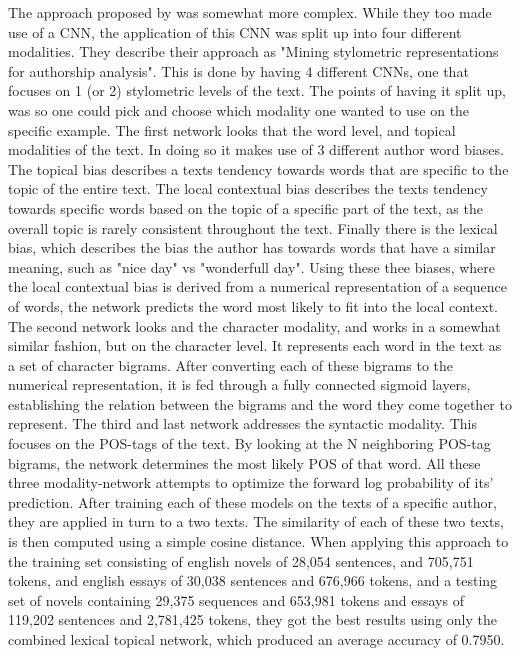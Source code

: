The approach proposed by \cite{ding2016} was somewhat more complex. While they
too made use of a \gls{CNN}, the application of this \gls{CNN} was split up into
four different modalities. They describe their approach as "Mining stylometric
representations for authorship analysis". This is done by having 4 different
\gls{CNN}s, one that focuses on 1 (or 2) stylometric levels of the text. The
points of having it split up, was so one could pick and choose which modality
one wanted to use on the specific example. The first network looks that the
word level, and topical modalities of the text. In doing so it makes use of
3 different author word biases. The topical bias describes a texts tendency
towards words that are specific to the topic of the entire text. The local
contextual bias describes the texts tendency towards specific words based on the
topic of a specific part of the text, as the overall topic is rarely consistent
throughout the text. Finally there is the lexical bias, which describes the bias
the author has towards words that have a similar meaning, such as "nice day"
vs "wonderfull day". Using these thee biases, where the local contextual bias
is derived from a numerical representation of a sequence of words, the network
predicts the word most likely to fit into the local context. The second network
looks and the character modality, and works in a somewhat similar fashion,
but on the character level. It represents each word in the text as a set of
character bigrams. After converting each of these bigrams to the numerical
representation, it is fed through a fully connected sigmoid layers, establishing
the relation between the bigrams and the word they come together to represent.
The third and last network addresses the syntactic modality. This focuses on
the \gls{POS}-tags of the text. By looking at the N neighboring \gls{POS}-tag
bigrams, the network determines the most likely \gls{POS} of that word. All
these three modality-network attempts to optimize the forward log probability of
its' prediction. After training each of these models on the texts of a specific
author, they are applied in turn to a two texts. The similarity of each of these
two texts, is then computed using a simple cosine distance. When applying this
approach to the training set consisting of english novels of 28,054 sentences,
and 705,751 tokens, and english essays of 30,038 sentences and 676,966 tokens,
and a testing set of novels containing 29,375 sequences and 653,981 tokens and
essays of 119,202 sentences and 2,781,425 tokens, they got the best results
using only the combined lexical topical network, which produced an average
accuracy of 0.7950.





